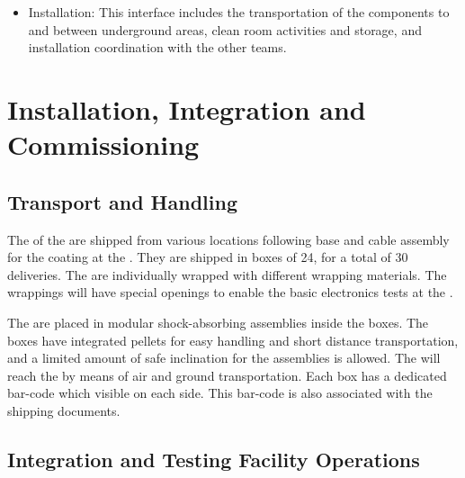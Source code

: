\begin{itemize}
\item Installation: This interface %
includes the transportation of the  components to and between underground areas, clean room activities and storage, and installation coordination with the other teams. 

\end{itemize}

\section{Installation, Integration and Commissioning}
\label{sec:fddp-pd-9}

\subsection{Transport and Handling}
\label{sec:fddp-pd-9.1}

The \dpnumpmtch {} of the  are shipped from various locations following base and cable assembly for the  coating at the . %
They are shipped in boxes of \num{24}, for a total of \num{30} deliveries.
The  are individually wrapped with different wrapping materials. The wrappings will have special openings to enable the basic electronics tests at the . 

The  are placed in modular shock-absorbing assemblies inside the boxes. %
The boxes have integrated pellets for easy handling and short distance transportation, and a limited amount of safe inclination for the assemblies is allowed. The  will reach the  by means of air and ground transportation. Each box has a dedicated bar-code which visible on each side. This bar-code is also associated with the shipping documents. 

\subsection{Integration and Testing Facility Operations}
\label{sec:fddp-pd-9.2}

